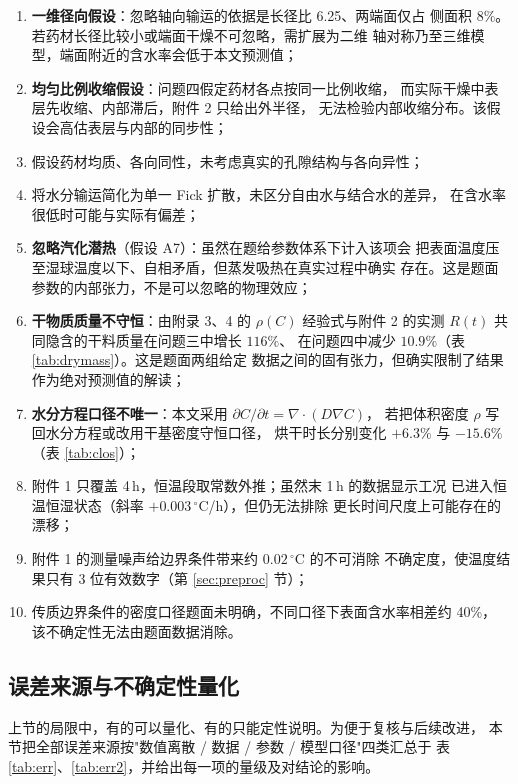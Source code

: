 \documentclass[12pt,a4paper,fontset=none]{ctexart}
\begin{document}
\begin{enumerate}
  \item \textbf{一维径向假设}：忽略轴向输运的依据是长径比 6.25、两端面仅占
        侧面积 $8\%$。若药材长径比较小或端面干燥不可忽略，需扩展为二维
        轴对称乃至三维模型，端面附近的含水率会低于本文预测值；
  \item \textbf{均匀比例收缩假设}：问题四假定药材各点按同一比例收缩，
        而实际干燥中表层先收缩、内部滞后，附件 2 只给出外半径，
        无法检验内部收缩分布。该假设会高估表层与内部的同步性；
  \item 假设药材均质、各向同性，未考虑真实的孔隙结构与各向异性；
  \item 将水分输运简化为单一 Fick 扩散，未区分自由水与结合水的差异，
        在含水率很低时可能与实际有偏差；
  \item \textbf{忽略汽化潜热}（假设 A7）：虽然在题给参数体系下计入该项会
        把表面温度压至湿球温度以下、自相矛盾，但蒸发吸热在真实过程中确实
        存在。这是题面参数的内部张力，不是可以忽略的物理效应；
  \item \textbf{干物质质量不守恒}：由附录 3、4 的 $\rho(C)$ 经验式与附件 2
        的实测 $R(t)$ 共同隐含的干料质量在问题三中增长 $116\%$、
        在问题四中减少 $10.9\%$（表 \ref{tab:drymass}）。这是题面两组给定
        数据之间的固有张力，但确实限制了结果作为绝对预测值的解读；
  \item \textbf{水分方程口径不唯一}：本文采用
        $\partial C/\partial t=\nabla\!\cdot\!(D\nabla C)$，
        若把体积密度 $\rho$ 写回水分方程或改用干基密度守恒口径，
        烘干时长分别变化 $+6.3\%$ 与 $-15.6\%$（表 \ref{tab:clos}）；
  \item 附件 1 只覆盖 4\,h，恒温段取常数外推；虽然末 1\,h 的数据显示工况
        已进入恒温恒湿状态（斜率 $+0.003\,^\circ$C/h），但仍无法排除
        更长时间尺度上可能存在的漂移；
  \item 附件 1 的测量噪声给边界条件带来约 $0.02\,^\circ$C 的不可消除
        不确定度，使温度结果只有 3 位有效数字（第 \ref{sec:preproc} 节）；
  \item 传质边界条件的密度口径题面未明确，不同口径下表面含水率相差约 40\%，
       该不确定性无法由题面数据消除。
\end{enumerate}

\subsection{误差来源与不确定性量化}
\label{sec:errorbudget}

上节的局限中，有的可以量化、有的只能定性说明。为便于复核与后续改进，
本节把全部误差来源按"数值离散 / 数据 / 参数 / 模型口径"四类汇总于
表 \ref{tab:err}、\ref{tab:err2}，并给出每一项的量级及对结论的影响。
\end{document}
